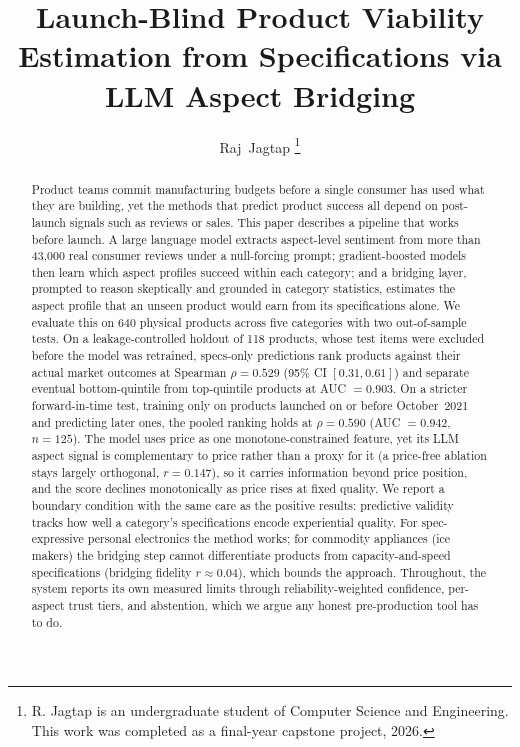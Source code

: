 \documentclass[journal]{IEEEtran}
\begin{document}
\title{Launch-Blind Product Viability Estimation from Specifications via LLM Aspect Bridging}

\author{Raj~Jagtap%
\thanks{R. Jagtap is an undergraduate student of Computer Science and Engineering. This work was completed as a final-year capstone project, 2026.}}

\maketitle

\begin{abstract}
Product teams commit manufacturing budgets before a single consumer has used what they are building, yet the methods that predict product success all depend on post-launch signals such as reviews or sales. This paper describes a pipeline that works before launch. A large language model extracts aspect-level sentiment from more than 43{,}000 real consumer reviews under a null-forcing prompt; gradient-boosted models then learn which aspect profiles succeed within each category; and a bridging layer, prompted to reason skeptically and grounded in category statistics, estimates the aspect profile that an unseen product would earn from its specifications alone. We evaluate this on 640 physical products across five categories with two out-of-sample tests. On a leakage-controlled holdout of 118 products, whose test items were excluded before the model was retrained, specs-only predictions rank products against their actual market outcomes at Spearman $\rho = 0.529$ (95\% CI $[0.31, 0.61]$) and separate eventual bottom-quintile from top-quintile products at AUC $= 0.903$. On a stricter forward-in-time test, training only on products launched on or before October~2021 and predicting later ones, the pooled ranking holds at $\rho = 0.590$ (AUC $= 0.942$, $n = 125$). The model uses price as one monotone-constrained feature, yet its LLM aspect signal is complementary to price rather than a proxy for it (a price-free ablation stays largely orthogonal, $r = 0.147$), so it carries information beyond price position, and the score declines monotonically as price rises at fixed quality. We report a boundary condition with the same care as the positive results: predictive validity tracks how well a category's specifications encode experiential quality. For spec-expressive personal electronics the method works; for commodity appliances (ice makers) the bridging step cannot differentiate products from capacity-and-speed specifications (bridging fidelity $r \approx 0.04$), which bounds the approach. Throughout, the system reports its own measured limits through reliability-weighted confidence, per-aspect trust tiers, and abstention, which we argue any honest pre-production tool has to do.
\end{abstract}
\end{document}

